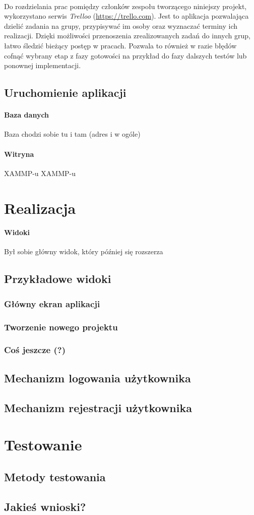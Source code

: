 \documentclass[a4paper, 12pt, oneside]{article}
\begin{document}
			\paragraph{}Do rozdzielania prac pomiędzy członków zespołu tworzącego niniejszy projekt, wykorzystano serwis \textit{Trelloo} (\url{https://trello.com}). Jest to aplikacja pozwalająca dzielić zadania na grupy, przypisywać im osoby oraz wyznaczać terminy ich realizacji. Dzięki możliwości przenoszenia zrealizowanych zadań do innych grup, łatwo śledzić bieżący postęp w pracach. Pozwala to również w razie błędów cofnąć wybrany etap z fazy gotowości na przykład do fazy dalszych testów lub ponownej implementacji. 
		\subsection{Uruchomienie aplikacji}
			\paragraph{Baza danych}
				Baza chodzi sobie tu i tam (adres i w ogóle)
			\paragraph{Witryna}
				XAMMP-u XAMMP-u
\section{Realizacja}
	\paragraph{Widoki}
		Był sobie główny widok, który później się rozszerza
		\subsection{Przykładowe widoki}
			\subsubsection{Główny ekran aplikacji}
			\subsubsection{Tworzenie nowego projektu}
			\subsubsection{Coś jeszcze (?)}
	\subsection{Mechanizm logowania użytkownika}
	\subsection{Mechanizm rejestracji użytkownika}
\section{Testowanie}
	\subsection{Metody testowania}
	\subsection{Jakieś wnioski?}
\end{document}
